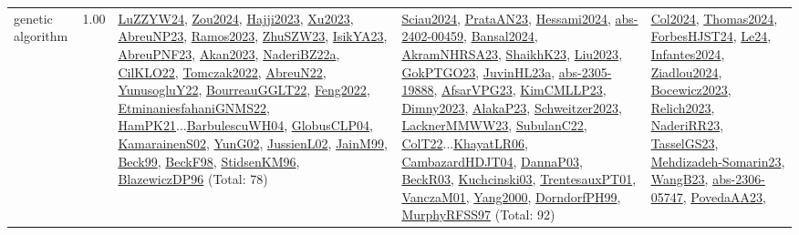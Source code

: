 {\begin{longtable}{p{3cm}r>{\raggedright\arraybackslash}p{6cm}>{\raggedright\arraybackslash}p{6cm}>{\raggedright\arraybackslash}p{8cm}}
\index{genetic algorithm}\index{Algorithms!genetic algorithm}genetic algorithm &  1.00 & \hyperref[detail:LuZZYW24]{LuZZYW24}, \hyperref[detail:Zou2024]{Zou2024}, \hyperref[detail:Hajji2023]{Hajji2023}, \hyperref[detail:Xu2023]{Xu2023}, \hyperref[detail:AbreuNP23]{AbreuNP23}, \hyperref[detail:Ramos2023]{Ramos2023}, \hyperref[detail:ZhuSZW23]{ZhuSZW23}, \hyperref[detail:IsikYA23]{IsikYA23}, \hyperref[detail:AbreuPNF23]{AbreuPNF23}, \hyperref[detail:Akan2023]{Akan2023}, \hyperref[detail:NaderiBZ22a]{NaderiBZ22a}, \hyperref[detail:CilKLO22]{CilKLO22}, \hyperref[detail:Tomczak2022]{Tomczak2022}, \hyperref[detail:AbreuN22]{AbreuN22}, \hyperref[detail:YunusogluY22]{YunusogluY22}, \hyperref[detail:BourreauGGLT22]{BourreauGGLT22}, \hyperref[detail:Feng2022]{Feng2022}, \hyperref[detail:EtminaniesfahaniGNMS22]{EtminaniesfahaniGNMS22}, \hyperref[detail:HamPK21]{HamPK21}...\hyperref[detail:BarbulescuWH04]{BarbulescuWH04}, \hyperref[detail:GlobusCLP04]{GlobusCLP04}, \hyperref[detail:KamarainenS02]{KamarainenS02}, \hyperref[detail:YunG02]{YunG02}, \hyperref[detail:JussienL02]{JussienL02}, \hyperref[detail:JainM99]{JainM99}, \hyperref[detail:Beck99]{Beck99}, \hyperref[detail:BeckF98]{BeckF98}, \hyperref[detail:StidsenKM96]{StidsenKM96}, \hyperref[detail:BlazewiczDP96]{BlazewiczDP96} (Total: 78) & \hyperref[detail:Sciau2024]{Sciau2024}, \hyperref[detail:PrataAN23]{PrataAN23}, \hyperref[detail:Hessami2024]{Hessami2024}, \hyperref[detail:abs-2402-00459]{abs-2402-00459}, \hyperref[detail:Bansal2024]{Bansal2024}, \hyperref[detail:AkramNHRSA23]{AkramNHRSA23}, \hyperref[detail:ShaikhK23]{ShaikhK23}, \hyperref[detail:Liu2023]{Liu2023}, \hyperref[detail:GokPTGO23]{GokPTGO23}, \hyperref[detail:JuvinHL23a]{JuvinHL23a}, \hyperref[detail:abs-2305-19888]{abs-2305-19888}, \hyperref[detail:AfsarVPG23]{AfsarVPG23}, \hyperref[detail:KimCMLLP23]{KimCMLLP23}, \hyperref[detail:Dimny2023]{Dimny2023}, \hyperref[detail:AlakaP23]{AlakaP23}, \hyperref[detail:Schweitzer2023]{Schweitzer2023}, \hyperref[detail:LacknerMMWW23]{LacknerMMWW23}, \hyperref[detail:SubulanC22]{SubulanC22}, \hyperref[detail:ColT22]{ColT22}...\hyperref[detail:KhayatLR06]{KhayatLR06}, \hyperref[detail:CambazardHDJT04]{CambazardHDJT04}, \hyperref[detail:DannaP03]{DannaP03}, \hyperref[detail:BeckR03]{BeckR03}, \hyperref[detail:Kuchcinski03]{Kuchcinski03}, \hyperref[detail:TrentesauxPT01]{TrentesauxPT01}, \hyperref[detail:VanczaM01]{VanczaM01}, \hyperref[detail:Yang2000]{Yang2000}, \hyperref[detail:DorndorfPH99]{DorndorfPH99}, \hyperref[detail:MurphyRFSS97]{MurphyRFSS97} (Total: 92) & \hyperref[detail:Col2024]{Col2024}, \hyperref[detail:Thomas2024]{Thomas2024}, \hyperref[detail:ForbesHJST24]{ForbesHJST24}, \hyperref[detail:Le24]{Le24}, \hyperref[detail:Infantes2024]{Infantes2024}, \hyperref[detail:Ziadlou2024]{Ziadlou2024}, \hyperref[detail:Bocewicz2023]{Bocewicz2023}, \hyperref[detail:Relich2023]{Relich2023}, \hyperref[detail:NaderiRR23]{NaderiRR23}, \hyperref[detail:TasselGS23]{TasselGS23}, \hyperref[detail:Mehdizadeh-Somarin23]{Mehdizadeh-Somarin23}, \hyperref[detail:WangB23]{WangB23}, \hyperref[detail:abs-2306-05747]{abs-2306-05747}, \hyperref[detail:PovedaAA23]{PovedaAA23}, 
\end{longtable}}
